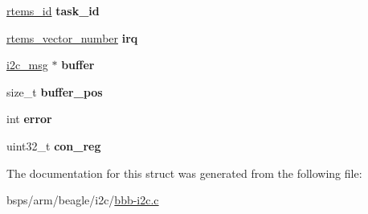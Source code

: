 \begin{DoxyCompactItemize}
\begin{tabbing}
\end{tabbing}\item 
\mbox{\label{structbbb__i2c__bus_a819a7ca9a750da584d0dfdf33f4e7d13}} 
\mbox{\hyperlink{group__ClassicTasks_gab20892b814dced7dd4e5b9bf42becd57}{rtems\+\_\+id}} {\bfseries task\+\_\+id}
\item 
\mbox{\label{structbbb__i2c__bus_a4d8d957fdad56f97b17d06c73f764243}} 
\mbox{\hyperlink{group__ClassicINTR_ga3e434c197d99f128e78cae4d9358bd8b}{rtems\+\_\+vector\+\_\+number}} {\bfseries irq}
\item 
\mbox{\label{structbbb__i2c__bus_a074a27b05b71ab731c925321f38a2900}} 
\mbox{\hyperlink{structi2c__msg}{i2c\+\_\+msg}} $\ast$ {\bfseries buffer}
\item 
\mbox{\label{structbbb__i2c__bus_a53fa10f77934733bad4d2f6c4b6f5e37}} 
size\+\_\+t {\bfseries buffer\+\_\+pos}
\item 
\mbox{\label{structbbb__i2c__bus_ae9ee076a41ebd366f308e201cae30364}} 
int {\bfseries error}
\item 
\mbox{\label{structbbb__i2c__bus_a4bc5cf22d1c71d5d0be179e1fe89fe5b}} 
uint32\+\_\+t {\bfseries con\+\_\+reg}
\end{DoxyCompactItemize}


The documentation for this struct was generated from the following file\+:\begin{DoxyCompactItemize}
\item 
bsps/arm/beagle/i2c/\mbox{\hyperlink{bbb-i2c_8c}{bbb-\/i2c.\+c}}\end{DoxyCompactItemize}
